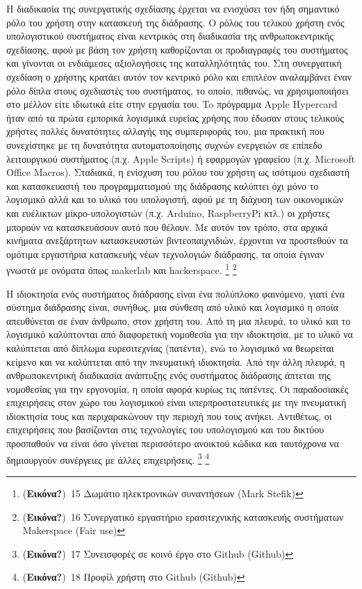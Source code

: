 \documentclass[
]{article}
\begin{document}
Η διαδικασία της συνεργατικής σχεδίασης έρχεται να ενισχύσει τον ήδη
σημαντικό ρόλο του χρήστη στην κατασκευή της διάδρασης. Ο ρόλος του
τελικού χρήστη ενός υπολογιστικού συστήματος είναι κεντρικός στη
διαδικασία της ανθρωποκεντρικής σχεδίασης, αφού με βάση τον χρήστη
καθορίζονται οι προδιαγραφές του συστήματος και γίνονται οι ενδιάμεσες
αξιολογήσεις της καταλληλότητάς του. Στη συνεργατική σχεδίαση ο χρήστης
κρατάει αυτόν τον κεντρικό ρόλο και επιπλέον αναλαμβάνει έναν ρόλο δίπλα
στους σχεδιαστές του συστήματος, το οποίο, πιθανώς, να χρησιμοποιήσει
στο μέλλον είτε ιδιωτικά είτε στην εργασία του. To πρόγραμμα Apple
Hypercard ήταν από τα πρώτα εμπορικά λογισμικά ευρείας χρήσης που έδωσαν
στους τελικούς χρήστες πολλές δυνατότητες αλλαγής της συμπεριφοράς του,
μια πρακτική που συνεχίστηκε με τη δυνατότητα αυτοματοποίησης συχνών
ενεργειών σε επίπεδο λειτουργικού συστήματος (π.χ. Apple Scripts) ή
εφαρμογών γραφείου (π.χ. Microsoft Office Macros). Σταδιακά, η ενίσχυση
του ρόλου του χρήστη ως ισότιμου σχεδιαστή και κατασκευαστή του
προγραμματισμού της διάδρασης καλύπτει όχι μόνο το λογισμικό αλλά και το
υλικό του υπολογιστή, αφού με τη διάχυση των οικονομικών και ευέλικτων
μίκρο-υπολογιστών (π.χ. Arduino, RaspberryPi κτλ.) οι χρήστες μπορούν να
κατασκευάσουν αυτό που θέλουν. Με αυτόν τον τρόπο, στα αρχικά κινήματα
ανεξάρτητων κατασκευαστών βιντεοπαιχνιδιών, έρχονται να προστεθούν τα
ομότιμα εργαστήρια κατασκευής νέων τεχνολογιών διάδρασης, τα οποία
έγιναν γνωστά με ονόματα όπως makerlab και hackerspace. \footnote{(\textbf{Εικόνα?})~15
  Δωμάτιο ηλεκτρονικών συναντήσεων (Mark Stefik)} \footnote{(\textbf{Εικόνα?})~16
  Συνεργατικό εργαστήριο ερασιτεχνικής κατασκευής συστήματων Makerspace
  (Fair use)}

Η ιδιοκτησία ενός συστήματος διάδρασης είναι ένα πολύπλοκο φαινόμενο,
γιατί ένα σύστημα διάδρασης είναι, συνήθως, μια σύνθεση από υλικό και
λογισμικό η οποία απευθύνεται σε έναν άνθρωπο, στον χρήστη του. Από τη
μια πλευρά, το υλικό και το λογισμικό καλύπτονται από διαφορετική
νομοθεσία για την ιδιοκτησία, με το υλικό να καλύπτεται από δίπλωμα
ευρεσιτεχνίας (πατέντα), ενώ το λογισμικό να θεωρείται κείμενο και να
καλύπτεται από την πνευματική ιδιοκτησία. Από την άλλη πλευρά, η
ανθρωποκεντρική διαδικασία ανάπτυξης ενός συστήματος διάδρασης άπτεται
της νομοθεσίας για την εργονομία, η οποία αφορά κυρίως τις πατέντες. Οι
παραδοσιακές επιχειρήσεις στον χώρο του λογισμικού είναι
υπερπροστατευτικές με την πνευματική ιδιοκτησία τους και περιχαρακώνουν
την περιοχή που τους ανήκει. Αντιθέτως, οι επιχειρήσεις που βασίζονται
στις τεχνολογίες του υπολογισμού και του δικτύου προσπαθούν να είναι όσο
γίνεται περισσότερο ανοικτού κώδικα και ταυτόχρονα να δημιουργούν
συνέργειες με άλλες επιχειρήσεις. \footnote{(\textbf{Εικόνα?})~17
  Συνεισφορές σε κοινό έργο στο Github (Github)} \footnote{(\textbf{Εικόνα?})~18
  Προφίλ χρήστη στο Github (Github)}
\end{document}
